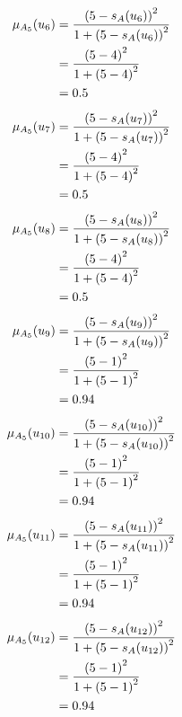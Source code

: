 \documentclass[a4paper,openany]{book}
\begin{document}
				\begin{align}
					\mu_{A_5}(u_6) &= \frac{\left(5-s_A(u_6)\right)^2}{1 + \left(5-s_A(u_6)\right)^2}\\
					&= \frac{\left(5-4\right)^2}{1 + \left(5-4\right)^2} \notag \\
					&= 0.5 \notag
				\end{align}
				\begin{align}
					\mu_{A_5}(u_7) &= \frac{\left(5-s_A(u_7)\right)^2}{1 + \left(5-s_A(u_7)\right)^2}\\
					&= \frac{\left(5-4\right)^2}{1 + \left(5-4\right)^2} \notag \\
					&= 0.5 \notag
				\end{align}
				\begin{align}
					\mu_{A_5}(u_8) &= \frac{\left(5-s_A(u_8)\right)^2}{1 + \left(5-s_A(u_8)\right)^2}\\
					&= \frac{\left(5-4\right)^2}{1 + \left(5-4\right)^2} \notag \\
					&= 0.5 \notag
				\end{align}
				\begin{align}
					\mu_{A_5}(u_9) &= \frac{\left(5-s_A(u_9)\right)^2}{1 + \left(5-s_A(u_9)\right)^2}\\
					&= \frac{\left(5-1\right)^2}{1 + \left(5-1\right)^2} \notag \\
					&= 0.94 \notag
				\end{align}
				\begin{align}
					\mu_{A_5}(u_{10}) &= \frac{\left(5-s_A(u_{10})\right)^2}{1 + \left(5-s_A(u_{10})\right)^2}\\
					&= \frac{\left(5-1\right)^2}{1 + \left(5-1\right)^2} \notag \\
					&= 0.94 \notag
				\end{align}
				\begin{align}
					\mu_{A_5}(u_{11}) &= \frac{\left(5-s_A(u_{11})\right)^2}{1 + \left(5-s_A(u_{11})\right)^2}\\
					&= \frac{\left(5-1\right)^2}{1 + \left(5-1\right)^2} \notag \\
					&= 0.94 \notag
				\end{align}
				\begin{align}
					\mu_{A_5}(u_{12}) &= \frac{\left(5-s_A(u_{12})\right)^2}{1 + \left(5-s_A(u_{12})\right)^2}\\
					&= \frac{\left(5-1\right)^2}{1 + \left(5-1\right)^2} \notag \\
					&= 0.94 \notag
				\end{align}
\end{document}
